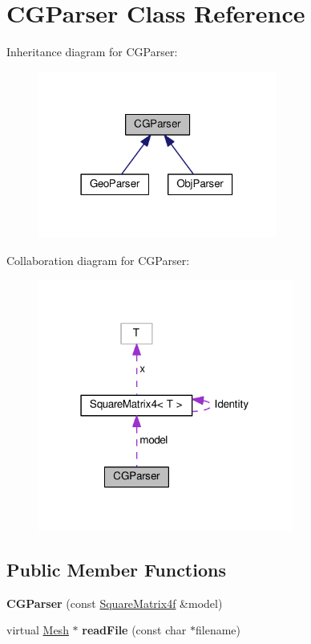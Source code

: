 \hypertarget{class_c_g_parser}{}\section{C\+G\+Parser Class Reference}
\label{class_c_g_parser}


Inheritance diagram for C\+G\+Parser\+:
\nopagebreak
\begin{figure}[H]
\begin{center}
\leavevmode
\includegraphics[width=222pt]{class_c_g_parser__inherit__graph}
\end{center}
\end{figure}


Collaboration diagram for C\+G\+Parser\+:
\nopagebreak
\begin{figure}[H]
\begin{center}
\leavevmode
\includegraphics[width=238pt]{class_c_g_parser__coll__graph}
\end{center}
\end{figure}
\subsection*{Public Member Functions}
\begin{DoxyCompactItemize}
\item 
{\bfseries C\+G\+Parser} (const \hyperlink{class_square_matrix4}{Square\+Matrix4f} \&model)\hypertarget{class_c_g_parser_a746d5bcad6df417f9975edf2c41aa0cb}{}\label{class_c_g_parser_a746d5bcad6df417f9975edf2c41aa0cb}

\item 
virtual \hyperlink{class_mesh}{Mesh} $\ast$ {\bfseries read\+File} (const char $\ast$filename)\hypertarget{class_c_g_parser_a9cb254862931fff40a91735f99ad8997}{}\label{class_c_g_parser_a9cb254862931fff40a91735f99ad8997}

\end{DoxyCompactItemize}
